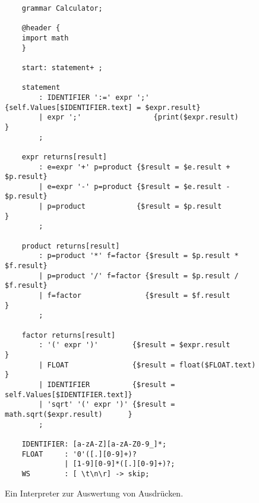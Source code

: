 \begin{figure}[!ht]
\centering
\begin{verbatim}
    grammar Calculator;
    
    @header {
    import math
    }
    
    start: statement+ ; 
    
    statement
        : IDENTIFIER ':=' expr ';' {self.Values[$IDENTIFIER.text] = $expr.result}
        | expr ';'                 {print($expr.result)                         }
        ;
    
    expr returns[result]
        : e=expr '+' p=product {$result = $e.result + $p.result}
        | e=expr '-' p=product {$result = $e.result - $p.result}
        | p=product            {$result = $p.result            }
        ;
    
    product returns[result]
        : p=product '*' f=factor {$result = $p.result * $f.result}
        | p=product '/' f=factor {$result = $p.result / $f.result}
        | f=factor               {$result = $f.result            }
        ;
    
    factor returns[result]
        : '(' expr ')'        {$result = $expr.result                 }
        | FLOAT               {$result = float($FLOAT.text)           }
        | IDENTIFIER          {$result = self.Values[$IDENTIFIER.text]}
        | 'sqrt' '(' expr ')' {$result = math.sqrt($expr.result)      }
        ;
    
    IDENTIFIER: [a-zA-Z][a-zA-Z0-9_]*;
    FLOAT     : '0'([.][0-9]+)?
              | [1-9][0-9]*([.][0-9]+)?;
    WS        : [ \t\n\r] -> skip; 
\end{verbatim}
\vspace*{-0.3cm}
\caption{Ein Interpreter zur Auswertung von Ausdr\"ucken.}
\label{fig:Calculator.g4}
\end{figure}

